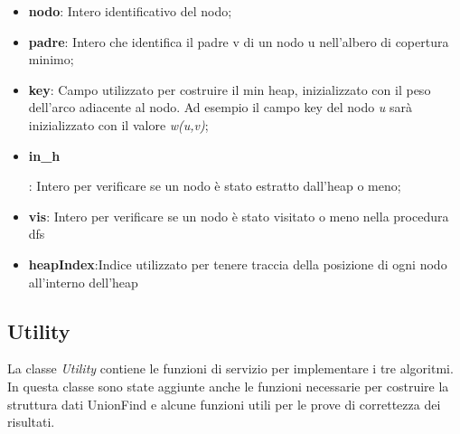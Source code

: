 \begin{itemize}
    \item \textbf{nodo}: Intero identificativo del nodo;
    \item \textbf{padre}: Intero che identifica il padre v di un nodo u nell'albero di copertura minimo;
    \item \textbf{key}: Campo utilizzato per costruire il min heap, inizializzato con il peso dell'arco adiacente al nodo. Ad esempio il campo key del nodo \emph{u} sarà inizializzato con il valore \emph{w(u,v)};
    \item \hypertarget{inh}{\textbf{in\_h}}: Intero per verificare se un nodo è stato estratto dall'heap o meno;
    \item \textbf{vis}: Intero per verificare se un nodo è stato visitato o meno nella procedura dfs
    \item \textbf{heapIndex}:Indice utilizzato per tenere traccia della posizione di ogni nodo all'interno dell'heap
\end{itemize}


\subsection{Utility}
\label{Utility}

La classe \textit{Utility} contiene le funzioni di servizio per implementare i tre algoritmi. In questa classe sono state aggiunte anche le funzioni necessarie per costruire la struttura dati UnionFind e alcune funzioni utili per le prove di correttezza dei risultati.

